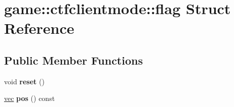 \hypertarget{structgame_1_1ctfclientmode_1_1flag}{}\section{game\+:\+:ctfclientmode\+:\+:flag Struct Reference}
\label{structgame_1_1ctfclientmode_1_1flag}
\subsection*{Public Member Functions}
\begin{DoxyCompactItemize}
\item 
\mbox{\label{structgame_1_1ctfclientmode_1_1flag_a1be2fea520554880c60cd4f115e6160d}} 
void {\bfseries reset} ()
\item 
\mbox{\label{structgame_1_1ctfclientmode_1_1flag_a75dc33c6193d592e45ca86085f8655e3}} 
\hyperlink{structvec}{vec} {\bfseries pos} () const
\end{DoxyCompactItemize}
